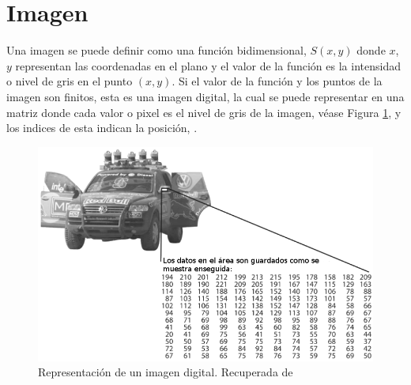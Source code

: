 
\section{Imagen}\label{ImagenDef} 

Una imagen se puede definir como una función bidimensional, $S(x,y)$ donde $x$, $y$ representan las coordenadas en el plano y el valor de la función es la intensidad o nivel de gris en el punto $(x,y)$. 
Si el valor de la función y los puntos de la imagen son finitos, esta es una imagen digital, la cual se puede representar en una matriz donde cada valor o pixel es el nivel de gris de la imagen, véase Figura \ref{fig:image}, y los indices de esta indican la posición, \citep{Gonzalez2002}. 

\begin{figure}[h!]
\begin{center}
\includegraphics[scale=.50]{./Figures/image.png}
\end{center}
\caption{Representación de un imagen digital. Recuperada de \citep{Shin2013}}
\label{fig:image}
\end{figure}







